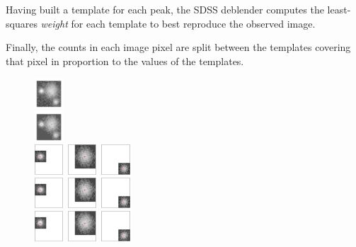 \documentclass[10pt,letter]{article}
\begin{document}
Having built a template for each peak, the SDSS deblender computes the
least-squares \emph{weight} for each template to best reproduce the
observed image.

Finally, the counts in each image pixel are split between the
templates covering that pixel in proportion to the values of the
templates.

\begin{figure}
\includegraphics[width=0.1\textwidth]{design-image-0828} \\
\includegraphics[width=0.1\textwidth]{design-parent-0828} \\
%
\includegraphics[width=0.1\textwidth]{design-0828-t0}%
\includegraphics[width=0.1\textwidth]{design-0828-t1}%
\includegraphics[width=0.1\textwidth]{design-0828-t2} \\
%
\includegraphics[width=0.1\textwidth]{design-0828-tw0}%
\includegraphics[width=0.1\textwidth]{design-0828-tw1}%
\includegraphics[width=0.1\textwidth]{design-0828-tw2} \\
%
\includegraphics[width=0.1\textwidth]{design-0828-h0}%
\includegraphics[width=0.1\textwidth]{design-0828-h1}%
\includegraphics[width=0.1\textwidth]{design-0828-h2} \\
\end{figure}
\end{document}
